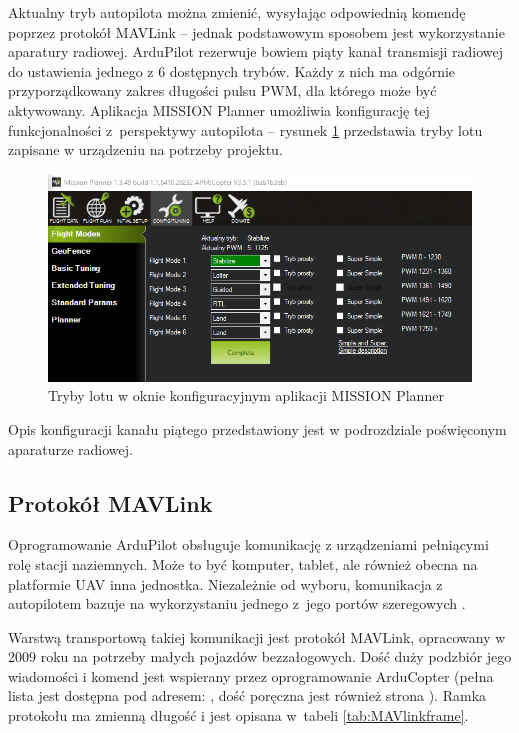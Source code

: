 Aktualny tryb autopilota można zmienić, wysyłając odpowiednią komendę poprzez protokół MAVLink -- jednak podstawowym sposobem jest wykorzystanie aparatury radiowej. 
ArduPilot rezerwuje bowiem piąty kanał transmisji radiowej do ustawienia jednego z 6 dostępnych trybów. 
Każdy z nich ma odgórnie przyporządkowany zakres długości pulsu PWM, dla którego może być aktywowany. 
Aplikacja MISSION Planner umożliwia konfigurację tej funkcjonalności z~perspektywy autopilota -- rysunek \ref{fig:flight_modes1} przedstawia tryby lotu zapisane w urządzeniu na potrzeby projektu.

\begin{figure}[ht]
	\centering
	\includegraphics[width=14cm]{B_flight_modes.png}
	\caption{Tryby lotu w oknie konfiguracyjnym aplikacji MISSION Planner}
	\label{fig:flight_modes1}
\end{figure}

Opis konfiguracji kanału piątego przedstawiony jest w podrozdziale poświęconym aparaturze radiowej.

\subsection{Protokół MAVLink}
\label{subsec:MAVLink}
Oprogramowanie ArduPilot obsługuje komunikację z urządzeniami pełniącymi rolę stacji naziemnych. 
Może to być komputer, tablet, ale również obecna na platformie UAV inna jednostka. 
Niezależnie od wyboru, komunikacja z autopilotem bazuje na wykorzystaniu jednego z~jego portów szeregowych \cite{PixhawkSerial}.

Warstwą transportową takiej komunikacji jest protokół MAVLink, opracowany w 2009 roku na potrzeby małych pojazdów bezzałogowych. 
Dość duży podzbiór jego wiadomości i komend jest wspierany przez oprogramowanie ArduCopter (pełna lista jest dostępna pod adresem: \cite{ArduCopterCmds}, dość poręczna jest również strona \cite{MAVLinkMSG}). 
Ramka protokołu ma zmienną długość i jest opisana w~tabeli \ref{tab:MAVlinkframe}.

